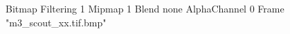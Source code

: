 {Bitmap
	{Filtering 1}
	{Mipmap 1}
	{Blend none}
	{AlphaChannel 0}
	{Frame "m3_scout_xx.tif.bmp"}
}

